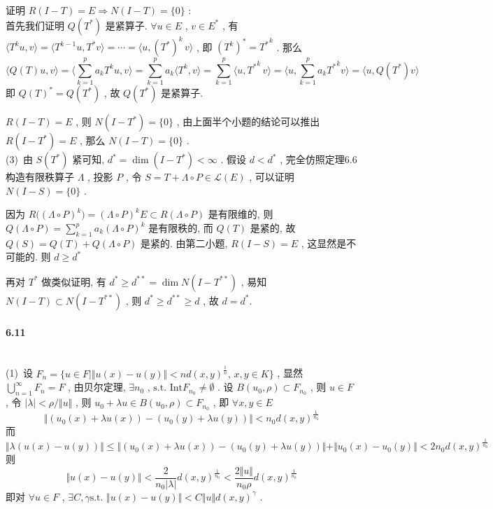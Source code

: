 \documentclass[a4paper, UTF8]{ctexart}				%
\numberwithin{equation}{section}				%
\begin{document}
        证明 $R(I - T) = E \Rightarrow N(I - T) = \{0\}$ :\\

        首先我们证明 $Q(T^*)$ 是紧算子. $\forall u \in E$ , $v \in E^*$ , 有 $\langle{T^k u},{v}\rangle = \langle{T^{k -1} u},{T^* v}\rangle = \cdots = \langle{u},{(T^*)^k\,v}\rangle$ , 即 $(T^k)^* = {T^*}^k$ . 那么 
        \[
            \langle{Q(T)u},{v}\rangle = \langle{\sum^{p}_{k = 1}a_k T^ku},{v}\rangle = \sum^{p}_{k =1}a_k \langle{T^k},{v}\rangle = \sum^{p}_{k = 1}\langle{u},{{T^*}^k\,v}\rangle = \langle{u},{\sum^{p}_{k = 1}a_k {T^*}^k v}\rangle = \langle{u},{Q(T^*)v}\rangle
        \]
        即 ${Q(T)}^* = Q(T^*)$ , 故 $Q(T^*)$ 是紧算子.
        
        $R(I - T) = E$ , 则 $N(I - T^*) = \{0\}$ , 由上面半个小题的结论可以推出 $R(I - T^*) = E$ , 那么 $N(I - T) = \{0\}$ .\\

        \noindent (3) \,由 $S(T^*)$ 紧可知, $d^* = \dim (I - T^*) < \infty$ . 假设 $d < d^*$ , 完全仿照定理6.6构造有限秩算子 $\Lambda$ , 投影 $P$ , 令 $S = T + \Lambda \circ P \in \mathcal{L}(E)$ , 可以证明 $N(I - S) = \{0\}$ .

        因为 $R\big({(\Lambda \circ P)}^k\big) = {(\Lambda \circ P)}^k E \subset R(\Lambda \circ P)$ 是有限维的, 则 $Q(\Lambda \circ P) = \sum^{p}_{k = 1}a_k {(\Lambda \circ P)}^k$ 是有限秩的, 而 $Q(T)$ 是紧的, 故$Q(S) = Q(T) + Q(\Lambda \circ P)$ 是紧的. 由第二小题, $R(I - S) = E$ , 这显然是不可能的. 则 $d \ge d^*$

        再对 $T^*$ 做类似证明, 有 $d^* \ge d^{**} = \dim N(I - T^{**})$ , 易知 $N(I - T) \subset N(I - T^{**})$ , 则 $d^* \ge d^{**} \ge d$ , 故 $d = d^*$.\\

    \paragraph{6.11}\quad \\
        \noindent (1) \,设 $F_n = \{u \in F | \Vert{u(x) - u(y)}\Vert < n d(x, y)^{\frac{1}{n}}, \, x, y  \in K\}$ , 显然 $\bigcup^{\infty}_{n = 1} F_n = F$ , 由贝尔定理, $\exists n_0$ , $\text{s.t. } \text{Int}F_{n_0} \neq \emptyset$ . 设 $B(u_0, \rho) \subset F_{n_0}$ , 则 $u \in F$ , 令 $\vert{\lambda}\vert < \rho/\Vert{u}\Vert$ , 则 $u_0 + \lambda u \in B(u_0, \rho) \subset F_{n_0}$ , 即 $\forall x, y \in E$
        \[
            \Vert{(u_0(x) + \lambda u(x)) - (u_0(y) + \lambda u(y))}\Vert < n_0 d(x,y)^{\frac{1}{n_0}}
        \]
        而 
        \[
            \Vert{\lambda(u(x) - u(y))}\Vert \le \Vert{(u_0(x) + \lambda u(x)) - (u_0(y) + \lambda u(y))}\Vert + \Vert{u_0(x) - u_0(y)}\Vert < 2n_0 d(x,y)^{\frac{1}{n_0}}
        \]
        则
        \[
            \Vert{u(x) - u(y)}\Vert < \frac{2}{n_0 \vert{\lambda}\vert} d(x,y)^{\frac{1}{n_0}} < \frac{2 \Vert{u}\Vert}{n_0 \rho} d(x,y)^{\frac{1}{n_0}}
        \]
        即对 $\forall u \in F$ , $\exists C, \gamma \text{s.t. } \Vert{u(x) - u(y)}\Vert < C \Vert{u}\Vert d(x,y)^\gamma$ .\\
        
\end{document}
